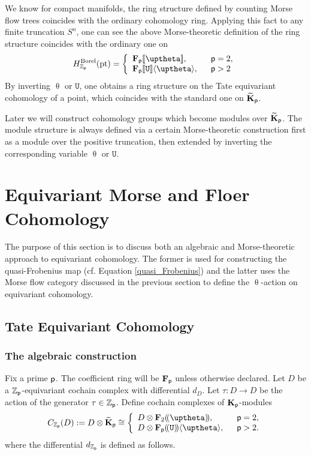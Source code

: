 \documentclass[reqno, 10pt]{amsart}
\numberwithin{equation}{section}
\numberwithin{equation}{section}
\theoremstyle{definition}
\theoremstyle{remark}
\newcommand{\beqn}{\begin{equation*}}
\newcommand{\eeqn}{\end{equation*}}
\newcommand{\mb}{\mathbb}
\newcommand{\p}{{\sf p}}
\newcommand{\fp}{{\bf F}_{\sf p}}
\newcommand{\kp}{{\bf K}_{\sf p}}
\newcommand{\tkp}{\wt{\bf K}_{\sf p}}
\newcommand{\zp}{{{\mb Z}_{\sf p}}}
\newcommand{\tu}{\mathtt{U}}
\newcommand{\psu}{{[\![\tu]\!]}}
\newcommand{\pst}{{[\![\uptheta]\!]}}
\newcommand{\lsu}{{(\!(\tu)\!)}}
\newcommand{\lst}{{(\!(\uptheta)\!)}}
\newcommand{\wt}{\widetilde}
\begin{document}
We know for compact manifolds, the ring structure defined by counting Morse flow trees coincides with the ordinary cohomology ring. Applying this fact to any finite truncation $S^n$, one can see the above Morse-theoretic definition of the ring structure coincides with the ordinary one on 
\beqn
H^{\rm Borel}_{\zp}({\rm pt}) = \left\{ \begin{array}{ll} \fp \pst,\ &\ \p = 2,\\
\fp \psu \langle \uptheta \rangle,\ &\ \p > 2 \end{array}\right.
\eeqn
By inverting $\uptheta$ or $\tu$, one obtains a ring structure on the Tate equivariant cohomology of a point, which coincides with the standard one on $\tkp$.

Later we will construct cohomology groups which become modules over $\tkp$. The module structure is always defined via a certain Morse-theoretic construction first as a module over the positive truncation, then extended by inverting the corresponding variable $\uptheta$ or $\tu$. 










\section{Equivariant Morse and Floer Cohomology}


The purpose of this section is to discuss both an algebraic and Morse-theoretic approach to equivariant cohomology. The former is used for constructing the quasi-Frobenius map (cf. Equation \eqref{quasi_Frobenius}) and the latter uses the Morse flow category discussed in the previous section to define the $\uptheta$-action on equivariant cohomology.


\subsection{Tate Equivariant Cohomology}

\subsubsection{The algebraic construction}

Fix a prime $\p$. The coefficient ring will be $\fp$ unless otherwise declared. Let $D$ be a $\zp$-equivariant cochain complex with differential $d_D$. Let $\tau: D \to D$ be the action of the generator $\tau \in \zp$. Define cochain complexes of $\kp$-modules
\beqn
C_{\zp} (D):=D \otimes \tkp \cong \left\{ \begin{array}{ll} D \otimes {\bf F}_2 \lst,\ &\ \p = 2,\\
                 D \otimes {\bf F}_\p \lsu \langle \uptheta \rangle,\ &\ \p > 2.\end{array} \right.
\eeqn
where the differential $d_{\zp}$ is defined as follows.
\end{document}
